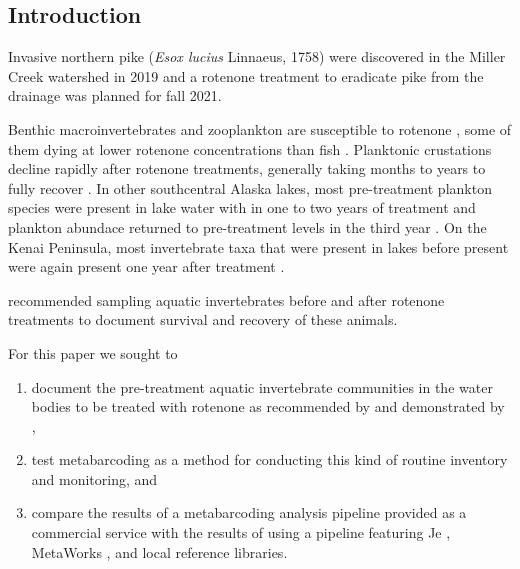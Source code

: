 \begin{multicols}{2}

\section{Introduction}

Invasive northern pike (\textit{Esox lucius} Linnaeus, 1758) were discovered in the Miller Creek watershed in 2019 \citep{KNWR2021} and a rotenone treatment to eradicate pike from the drainage was planned for fall 2021.

Benthic macroinvertebrates and zooplankton are susceptible to rotenone \citep{Finlaysonetal2018}, some of them dying at lower rotenone concentrations than fish \citep{Rach1988}. Planktonic crustations decline rapidly after rotenone treatments, generally taking months to years to fully recover \citep{Kiseretal1963, Anderson1970}. In other southcentral Alaska lakes, most pre-treatment plankton species were present in lake water with in one to two years of treatment and plankton abundace returned to pre-treatment levels in the third year \citep{Chlupach1977}. On the Kenai Peninsula, most invertebrate taxa that were present in lakes before present were again present one year after treatment \citep{Massengill2014, Massengill2017}. 

\citet{Finlaysonetal2018} recommended sampling aquatic invertebrates before and after rotenone treatments to document survival and recovery of these animals.

For this paper we sought to

\begin{enumerate}
\item document the pre-treatment aquatic invertebrate communities in the water bodies to be treated with rotenone as recommended by \citet{Finlaysonetal2018} and demonstrated by \citep{Massengill2014, Massengill2017},
\item test metabarcoding as a method for conducting this kind of routine inventory and monitoring, and
\item compare the results of a metabarcoding analysis pipeline provided as a commercial service with the results of using a pipeline featuring Je \citep{Girardotetal2016}, MetaWorks \citep{PorterHajibabaei2020}, and local reference libraries.
\end{enumerate}



\end{multicols}
